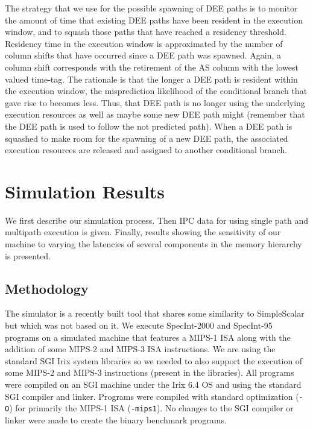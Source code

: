 \documentclass[10pt,twocolumn,dvips]{article}
\begin{document}
The strategy that we use for the possible spawning of DEE paths
is to monitor
the amount of time that existing DEE paths have been
resident in the execution window, and to squash those paths that
have reached a residency threshold.  Residency time in the
execution window is approximated by the number of column shifts that
have occurred since a DEE path was spawned.  
Again, a column
shift corresponds with the retirement of the AS column with the
lowest valued time-tag.
The rationale is that the longer a DEE path is resident
within the execution window,
the misprediction likelihood of the conditional branch that gave rise 
to becomes less.  
Thus, that DEE path is no longer using the
underlying execution resources as well as maybe some new DEE
path might (remember that the DEE path is used to follow the not predicted
path).
When a DEE path is 
squashed to make room for
the spawning of a new DEE path, the associated
execution resources are released and assigned to another conditional
branch.
%
%
\section{Simulation Results}
%
We first describe our simulation process.
Then IPC data for using single path and multipath execution
is given.
Finally, results showing the sensitivity of our machine
to varying the latencies of several components in the memory hierarchy
is presented.
%
%
\subsection{Methodology}
%
The simulator is a recently built tool that shares some similarity
to SimpleScalar \cite{Austin97} but which was not based on it.
We execute
SpecInt-2000 and SpecInt-95 programs on a simulated machine
that features a MIPS-1 ISA along with the addition of some MIPS-2 and
MIPS-3 ISA instructions.  We are using the standard SGI Irix system
libraries so we needed to also support the execution of some
MIPS-2 and MIPS-3 instructions (present in the libraries).
All programs were compiled on an SGI machine under the
Irix 6.4 OS and using the standard SGI compiler and linker.  
Programs were compiled with
standard optimization ({\tt -O}) for primarily the MIPS-1 ISA ({\tt -mips1}).
No changes to the SGI compiler or linker were made to create
the binary benchmark programs.
\end{document}
